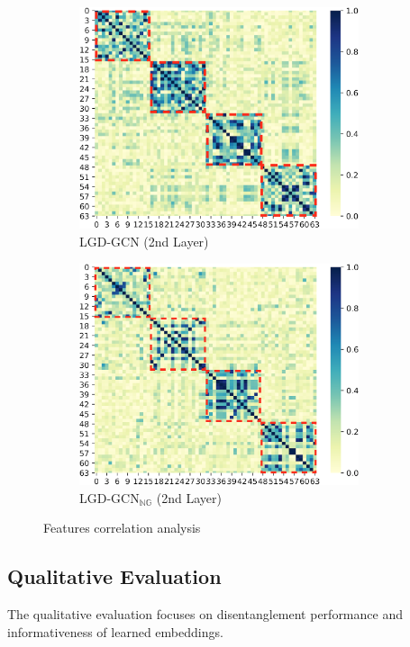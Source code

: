 \documentclass[accepted]{uai2021} %
\begin{document}
\begin{figure}[t]
\begin{subfigure}[b]{0.235\textwidth}
        \includegraphics[width=0.9\textwidth]{2ndlayer_2nd.png}
        \caption{LGD-GCN (2nd Layer)}\label{fig:2L_lgd2nd}
    \end{subfigure}
    \hfill
    \begin{subfigure}[b]{0.235\textwidth}
        \centering
        \includegraphics[width=0.9\textwidth]{2ndlayer_ng2nd.png}
        \caption{LGD-GCN$_{\mathbb{NG}}$ (2nd Layer)}\label{fig:2L_lgdng2nd}
    \end{subfigure}
    \caption{Features correlation analysis}
    \label{fig:FeatCorrelation}
\end{figure}

\subsection{Qualitative Evaluation}\label{sec:exp_q2}
The qualitative evaluation focuses on disentanglement performance and informativeness of learned embeddings. %
\end{document}
